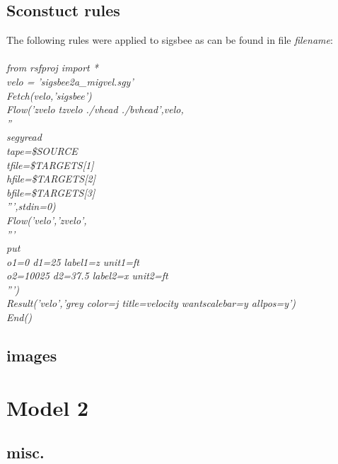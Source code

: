 \subsection{Sconstuct rules}
The following rules were applied to sigsbee as can be found in file \emph{filename}:\\
\emph{
\small{
\\
from rsfproj import *\\                                                                                             
velo = 'sigsbee2a\_migvel.sgy'\\
Fetch(velo,'sigsbee')\\                                                                                                                      Flow('zvelo tzvelo ./vhead ./bvhead',velo,\\
     \indent ''\\
     \indent segyread\\
     \indent tape=\$SOURCE\\
     \indent tfile=\${TARGETS[1]}\\
     \indent hfile=\${TARGETS[2]}\\
     \indent bfile=\${TARGETS[3]}\\
     \indent ''',stdin=0)\\                                                                                                       
Flow('velo','zvelo',\\
        \indent'''\\
        \indent put\\
        \indent o1=0     d1=25   label1=z unit1=ft\\
        \indent o2=10025 d2=37.5 label2=x unit2=ft\\
        \indent ''')\\                                                                                                                         
Result('velo','grey color=j title=velocity wantscalebar=y allpos=y')\\
End()\\
}}                                                                                                                                           \subsection{images}

\section{Model 2}
\subsection{misc.}


